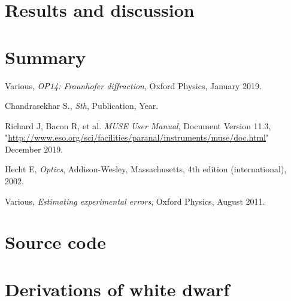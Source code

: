 \documentclass[]{article}
\begin{document}
\section{Results and discussion}\label{sec:results-and-discussion}


\section{Summary}\label{sec:summary}

	\begin{thebibliography}{9}
		
		Various,
		\textit{OP14: Fraunhofer diffraction},
		Oxford Physics,
		January 2019.	
		
		Chandrasekhar S.,
		\textit{Sth},
		Publication,
		Year.

		Richard J, Bacon R, et al.
		\textit{MUSE User Manual},
		Document Version 11.3,
		"\url{http://www.eso.org/sci/facilities/paranal/instruments/muse/doc.html}"
		December 2019.
		
		Hecht E,
		\textit{Optics},
		Addison-Wesley, Massachusetts,
		4th edition (international),
		2002.
		
		Various,
		\textit{Estimating experimental errors},
		Oxford Physics,
		August 2011.
		
	\end{thebibliography}

\appendix
\section{Source code}\label{app:source-code}
\section{Derivations of white dwarf}\label{app:WD-derivations}
\end{document}
